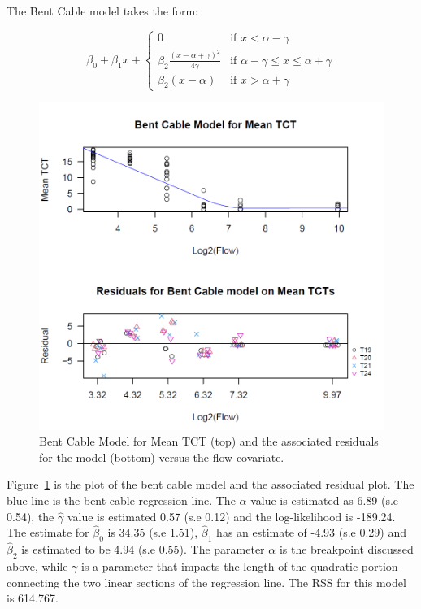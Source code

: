  \vspace{5mm}
 
The Bent Cable model takes the form:
\vspace{5mm}


 $$ \beta_{0}+\beta_{1}x+ \begin{cases}
0  &  \text{if    } x < \alpha-\gamma \\[2ex]
\beta_{2}\frac{(x-\alpha+\gamma)^{2}}{4\gamma}  &  \text{if    } \alpha-\gamma  \le x \le \alpha+\gamma \\[2ex]
\beta_{2}(x-\alpha) & \text{if  } x > \alpha+\gamma
\end{cases}$$



\begin{figure}[H]
\includegraphics[scale=0.7]{Chapter4Images/meantctbentcable.png}
\caption{Bent Cable Model for Mean TCT (top) and the associated residuals for the model (bottom) versus the flow covariate.}
\label{fig:meanbc}
\end{figure}





Figure~\ref{fig:meanbc}  is the plot of the bent cable model and the associated residual plot. The blue line is the bent cable regression line. The $\hat\alpha$ value is estimated as 6.89 (s.e 0.54), the $\hat\gamma$ value is estimated 0.57 (s.e 0.12) and the log-likelihood  is -189.24. The estimate for $\hat\beta_{0}$ is 34.35 (s.e 1.51), $\hat\beta_{1}$ has an estimate of -4.93 (s.e 0.29) and $\hat\beta_{2}$ is estimated to be 4.94 (s.e 0.55). The parameter $\alpha$ is the breakpoint discussed above, while $\gamma$ is a parameter that impacts the length of the quadratic portion connecting the two linear sections of the regression line. The RSS for this model is 614.767. 


